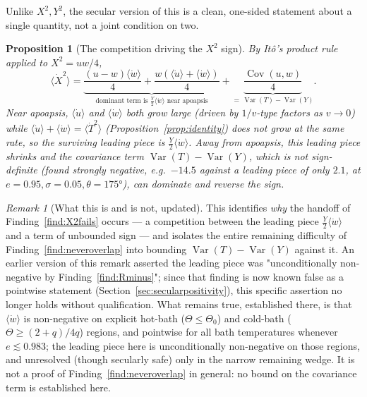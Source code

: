 \documentclass[12pt]{amsart}
\theoremstyle{plain}
\newtheorem{proposition}[theorem]{Proposition}
\theoremstyle{remark}
\newtheorem*{remark}{Remark}
\begin{document}
Unlike $X^2,Y^2$, the secular version of this is a clean, one-sided statement about a single quantity, not a joint condition on two.

\begin{proposition}[The competition driving the $X^2$ sign]\label{prop:mechanism}
By It\^o's product rule applied to $X^2=uw/4$,
\begin{equation}
\langle\dot X^2\rangle = \underbrace{\frac{(u-w)\langle\dot w\rangle}{4} + \frac{w(\langle\dot u\rangle+\langle\dot w\rangle)}{4}}_{\text{dominant term is }\frac{Y}{2}\langle\dot w\rangle\text{ near apoapsis}} + \underbrace{\frac{\operatorname{Cov}(u,w)}{4}}_{=\,\operatorname{Var}(T)-\operatorname{Var}(Y)}. \tag{4}
\end{equation}
Near apoapsis, $\langle\dot u\rangle$ and $\langle\dot w\rangle$ both grow large (driven by $1/v$-type factors as $v\to0$) while $\langle\dot u\rangle+\langle\dot w\rangle=\langle\dot T^2\rangle$ (Proposition~\ref{prop:identity}) does not grow at the same rate, so the surviving leading piece is $\tfrac{Y}{2}\langle\dot w\rangle$. Away from apoapsis, this leading piece shrinks and the covariance term $\operatorname{Var}(T)-\operatorname{Var}(Y)$, which is not sign-definite (found strongly negative, e.g.\ $-14.5$ against a leading piece of only $2.1$, at $e=0.95,\sigma=0.05,\theta=175°$), can dominate and reverse the sign.
\end{proposition}

\begin{remark}[What this is and is not, updated]
This identifies \emph{why} the handoff of Finding~\ref{find:X2fails} occurs --- a competition between the leading piece $\tfrac{Y}{2}\langle\dot w\rangle$ and a term of unbounded sign --- and isolates the entire remaining difficulty of Finding~\ref{find:neveroverlap} into bounding $\operatorname{Var}(T)-\operatorname{Var}(Y)$ against it. An earlier version of this remark asserted the leading piece was "unconditionally non-negative by Finding~\ref{find:Rminus}"; since that finding is now known false as a pointwise statement (Section~\ref{sec:secularpositivity}), this specific assertion no longer holds without qualification. What remains true, established there, is that $\langle\dot w\rangle$ is non-negative on explicit hot-bath ($\Theta\leq\Theta_0$) and cold-bath ($\Theta\geq(2+q)/4q$) regions, and pointwise for all bath temperatures whenever $e\lesssim0.983$; the leading piece here is unconditionally non-negative on those regions, and unresolved (though secularly safe) only in the narrow remaining wedge. It is not a proof of Finding~\ref{find:neveroverlap} in general: no bound on the covariance term is established here.
\end{remark}
\end{document}
